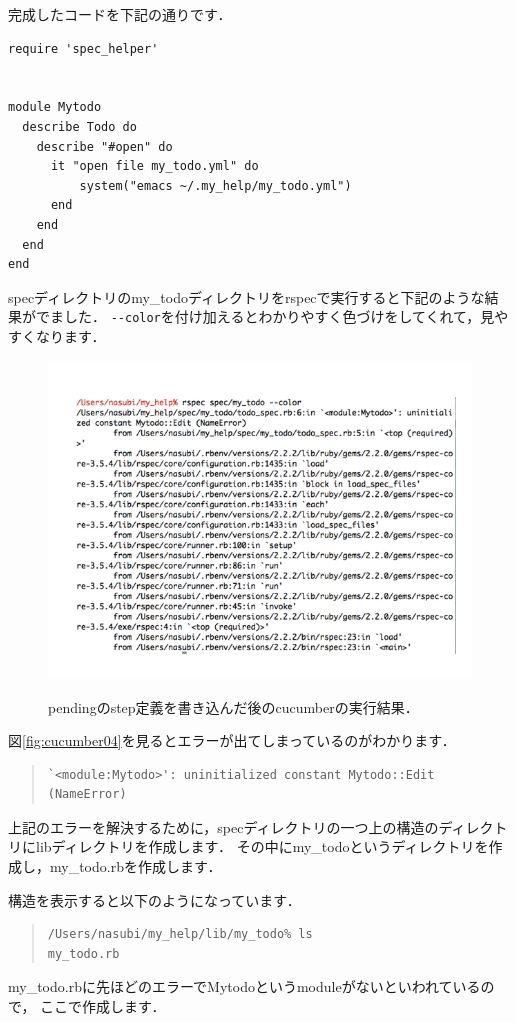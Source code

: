 完成したコードを下記の通りです．
\begin{lstlisting}[style=customRuby,basicstyle={\scriptsize\ttfamily}]
require 'spec_helper'


module Mytodo
  describe Todo do
    describe "#open" do
      it "open file my_todo.yml" do
          system("emacs ~/.my_help/my_todo.yml")
      end
    end
  end
end

\end{lstlisting}
specディレクトリのmy\_todoディレクトリをrspecで実行すると下記のような結果がでました．
\verb|--color|を付け加えるとわかりやすく色づけをしてくれて，見やすくなります．

\begin{figure}[htbp]\begin{center}
\includegraphics[width=12cm,bb= 0 0 937 753]{../figs/./cucumber04.001.jpg}
\caption{pendingのstep定義を書き込んだ後のcucumberの実行結果．}
\label{fig:cucumber04}
\label{default}\end{center}\end{figure}
図\ref{fig:cucumber04}を見るとエラーが出てしまっているのがわかります．
\begin{quote}\begin{verbatim}
`<module:Mytodo>': uninitialized constant Mytodo::Edit (NameError)
\end{verbatim}\end{quote}
上記のエラーを解決するために，specディレクトリの一つ上の構造のディレクトリにlibディレクトリを作成します．
その中にmy\_todoというディレクトリを作成し，my\_todo.rbを作成します．

構造を表示すると以下のようになっています．
\begin{quote}\begin{verbatim}
/Users/nasubi/my_help/lib/my_todo% ls
my_todo.rb
\end{verbatim}\end{quote}
my\_todo.rbに先ほどのエラーでMytodoというmoduleがないといわれているので，
ここで作成します．

